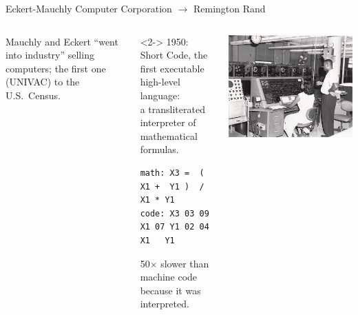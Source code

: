 \documentclass[aspectratio=169]{beamer}
\begin{document}
\begin{frame}[fragile]{Eckert-Mauchly Computer Corporation $\to$ Remington Rand}
\vspace{0.5 cm}

\begin{columns}
Mauchly and Eckert ``went into industry'' selling computers; the first one (UNIVAC) to the U.S.\ Census.

\vspace{0.5 cm}
\begin{uncoverenv}<2->
1950: Short Code, the first executable high-level language: \\ a transliterated interpreter of mathematical formulas.
\begin{center}
\small
\vspace{-0.1 cm}
\begin{minipage}{0.8\linewidth}
\begin{verbatim}
math: X3 =  (  X1 +  Y1 )  /  X1 * Y1
code: X3 03 09 X1 07 Y1 02 04 X1   Y1
\end{verbatim}
\end{minipage}

\vspace{0.2 cm}
\normalsize
50$\times$ slower than machine code because it was interpreted.
\end{center}
\end{uncoverenv}

\vspace{0.5 cm}

\vspace{0.5 cm}

\includegraphics[width=\linewidth]{Univac_I_at_Census_Bureau_with_two_operators.jpg}


\end{columns}
\end{frame}
\end{document}
